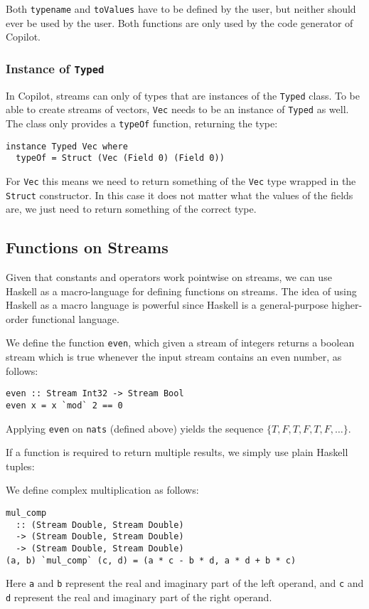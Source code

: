 Both \texttt{typename} and \texttt{toValues} have to be defined by the user,
but neither should ever be used by the user. Both functions are only used by
the code generator of Copilot.


\subsubsection*{Instance of \texttt{Typed}}
In Copilot, streams can only of types that are instances of the \texttt{Typed}
class. To be able to create streams of vectors, \texttt{Vec} needs to be an
instance of \texttt{Typed} as well. The class only provides a \texttt{typeOf}
function, returning the type:
\begin{lstlisting}[language=Copilot]
instance Typed Vec where
  typeOf = Struct (Vec (Field 0) (Field 0))
\end{lstlisting}
For \texttt{Vec} this means we need to return something of the \texttt{Vec}
type wrapped in the \texttt{Struct} constructor. In this case it does not
matter what the values of the fields are, we just need to return something of
the correct type.


\subsection{Functions on Streams} \label{sec:FnOnStreams}

Given that constants and operators work pointwise on streams, we can use Haskell
as a macro-language for defining functions on streams.  The idea of using
Haskell as a macro language is powerful since Haskell is a
general-purpose higher-order functional language.

\begin{example}
We define the function {\tt even}, which given a stream of
integers returns a boolean stream which is true whenever the input stream
contains an even number, as follows:
%
\begin{lstlisting}[language = Copilot, frame = single]
even :: Stream Int32 -> Stream Bool
even x = x `mod` 2 == 0
\end{lstlisting}
%
Applying {\tt even} on {\tt nats} (defined above) yields the sequence
$\{T, F, T, F, T, F, \dots\}$.
\end{example}

If a function is required to return multiple results, we simply use plain
Haskell tuples:

\begin{example}
We define complex multiplication as follows:
%
\begin{lstlisting}[language = Copilot, frame = single]
mul_comp
  :: (Stream Double, Stream Double)
  -> (Stream Double, Stream Double)
  -> (Stream Double, Stream Double)
(a, b) `mul_comp` (c, d) = (a * c - b * d, a * d + b * c)
\end{lstlisting}
%
Here {\tt a} and {\tt b} represent the real and imaginary part of the left
operand, and {\tt c} and {\tt d} represent the real and imaginary part
of the right operand.
\end{example}

